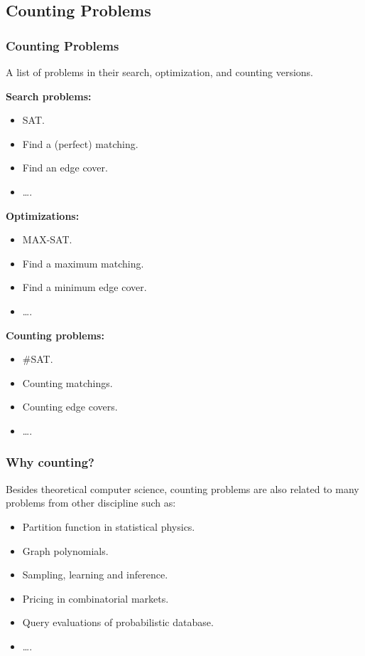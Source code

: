 \documentclass[mathserif]{beamer}
\begin{document}
\subsection{Counting Problems}
\begin{frame}
	\frametitle{Counting Problems}
	A list of problems in their search, optimization, and counting versions.
	\bigskip

	\begin{minipage}[tb]{0.3\linewidth}
		{\bf Search problems:}
		\begin{itemize}
			\item SAT.
			\item Find a (perfect) matching.
			\item Find an edge cover.
			\item \dots.
		\end{itemize}
	\end{minipage}
	\pause
	\begin{minipage}[tb]{0.3\linewidth}
		{\bf Optimizations:}
		\begin{itemize}
			\item MAX-SAT.
			\item Find a maximum matching.
			\item Find a minimum edge cover.
			\item \dots.
		\end{itemize}
	\end{minipage}
	\pause
	\begin{minipage}[tb]{0.3\linewidth}
		{\bf Counting problems:}
		\begin{itemize}
			\item \#SAT.
			\item Counting matchings.
			\item Counting edge covers.
			\item \dots.
		\end{itemize}
	\end{minipage}
\end{frame}

\begin{frame}
	\frametitle{Why counting?}
Besides theoretical computer science, counting problems are also related to many problems from other discipline such as:
\begin{itemize}
	\item Partition function in statistical physics.
		\pause
	\item Graph polynomials.
		\pause
	\item Sampling, learning and inference.
		\pause
    \item Pricing in combinatorial markets.
	\item Query evaluations of probabilistic database.
	\item \dots.
\end{itemize}
\end{frame}
\end{document}
